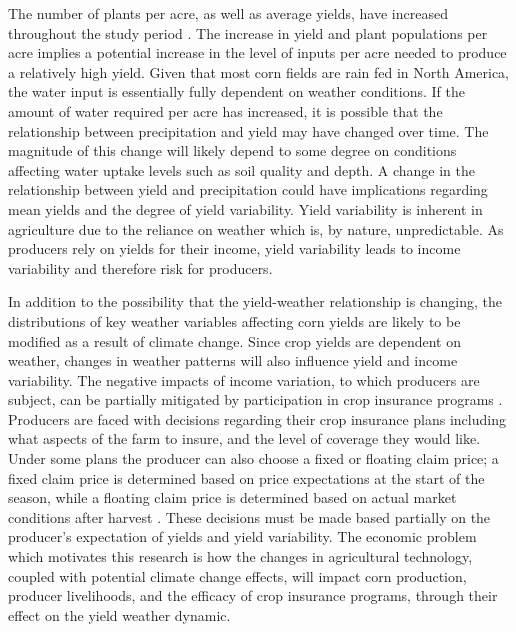  The number of plants per acre, as well as average yields, have increased throughout the study period \citep{duvick2005contribution}. The increase in yield and plant populations per acre implies a potential increase in the level of inputs per acre needed to produce a relatively high yield. Given that most corn fields are rain fed in North America, the water input is essentially fully dependent on weather conditions. If the amount of water required per acre has increased, it is possible that the relationship between precipitation and yield may have changed over time. The magnitude of this change will likely depend to some degree on conditions affecting water uptake levels such as soil quality and depth. A change in the relationship between yield and precipitation could have implications regarding mean yields and the degree of yield variability. Yield variability is inherent in agriculture due to the reliance on weather which is, by nature, unpredictable. As producers rely on yields for their income, yield variability leads to income variability and therefore risk for producers. 

In addition to the possibility that the yield-weather relationship is changing, the distributions of key weather variables affecting corn yields are likely to be modified as a result of climate change. Since crop yields are dependent on weather, changes in weather patterns will also influence yield and income variability. The negative impacts of income variation, to which producers are subject, can be partially mitigated by participation in crop insurance programs \citep{rosenzweig2002increased}. Producers are faced with decisions regarding their crop insurance plans including what aspects of the farm to insure, and the level of coverage they would like. Under some plans the producer can also choose a fixed or floating claim price; a fixed claim price is determined based on price expectations at the start of the season, while a floating claim price is determined based on actual market conditions after harvest \citep{Agri2014, NCIS}. These decisions must be made based partially on the producer's expectation of yields and yield variability. The economic problem which motivates this research is how the changes in agricultural technology, coupled with potential climate change effects, will impact corn production, producer livelihoods, and the efficacy of crop insurance programs, through their effect on the yield weather dynamic.

